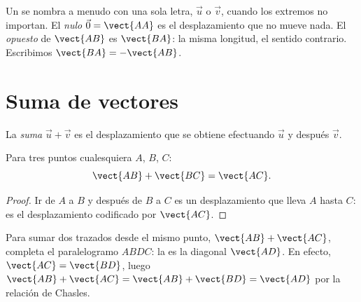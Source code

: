 \begin{notation}
Un  se nombra a menudo con una sola letra, $\vec u$ o $\vec v$,
cuando los extremos no importan. El \emph{ nulo}
$\vec 0 = \vect{AA}$ es el desplazamiento que no mueve nada. El
\emph{opuesto} de $\vect{AB}$ es $\vect{BA}$: la misma longitud, el
sentido contrario. Escribimos $\vect{BA} = -\vect{AB}$.
\end{notation}

\section{Suma de vectores}

\begin{definition}\label{def:g10:vectors:sum}
La \emph{suma} $\vec u + \vec v$ es el desplazamiento
que se obtiene efectuando $\vec u$ y después $\vec v$.
\end{definition}

\begin{theorem}\label{thm:g10:vectors:chasles}
Para tres puntos cualesquiera $A$, $B$, $C$:
\[
\vect{AB} + \vect{BC} = \vect{AC}.
\]
\end{theorem}

\begin{proof}
Ir de $A$ a $B$ y después de $B$ a $C$ es un desplazamiento que lleva $A$
hasta $C$: es el desplazamiento codificado por $\vect{AC}$.
\end{proof}

\begin{remark}
Para sumar dos  trazados desde el mismo punto,
$\vect{AB} + \vect{AC}$, completa el paralelogramo $ABDC$: la  es la
diagonal $\vect{AD}$. En efecto, $\vect{AC} = \vect{BD}$, luego
$\vect{AB} + \vect{AC} = \vect{AB} + \vect{BD} = \vect{AD}$ por la
relación de Chasles.
\end{remark}

